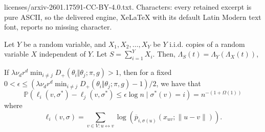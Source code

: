 \documentclass[10pt,a4paper]{amsart}
\newcommand{\visible}{\leftrightarrow{}}
\renewcommand{\P}{\mathbb{P}}
\begin{document}
licenses/arxiv-2601.17591-CC-BY-4.0.txt. Characters: every retained excerpt is pure ASCII, so the delivered engine, XeLaTeX with its default Latin Modern text font, reports no missing character.
\begin{fact}
\label{fact:CGF_formula}
    Let $Y$ be a random variable, and $X_1, X_2, \ldots, X_Y$ be $Y$ i.i.d. copies of a random variable $X$ independent of $Y$. Let $S = \sum_{i=1}^Y X_i$. Then, $\Lambda_S(t) = \Lambda_Y(\Lambda_X(t))$,
\end{fact}

\begin{lemma}
\label{lem:correct_labels_MAP_failures}
    If $\lambda \nu_d r^d \min_{i \neq j} D_+(\theta_i \Vert \theta_j; \pi, g) > 1$, then for a fixed $0 < \epsilon \leq (\lambda \nu_d r^d \min_{i \neq j} D_+(\theta_i \Vert \theta_j; \pi, g) - 1 ) / 2$, we have that
    \begin{equation*}
        \P(\ell_i(v, \sigma^*) - \ell_j(v, \sigma^*) \leq \epsilon \log n \mid \sigma^*(v) = i) = n^{-(1 + \Omega(1))}
    \end{equation*}
    where
    \begin{equation*}
        \ell_i(v, \sigma) = \sum_{v \in V: u \visible v} \log(\overline{p}_{i, \sigma(u)}(x_{uv};\|u - v\|)).
    \end{equation*}
\end{lemma}
\end{document}
